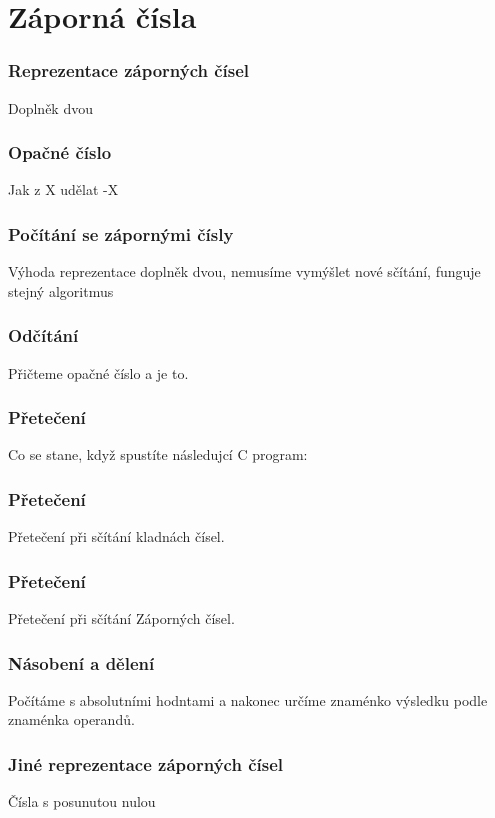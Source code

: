 \documentclass{beamer}
\begin{document}
\section{Záporná čísla}
\begin{frame}
\frametitle{Reprezentace záporných čísel}
Doplněk dvou

\end{frame}

\begin{frame}
\frametitle{Opačné číslo}

Jak z X udělat -X

\end{frame}


\begin{frame}
\frametitle{Počítání se zápornými čísly}

Výhoda reprezentace doplněk dvou, nemusíme vymýšlet nové sčítání, funguje stejný algoritmus
\end{frame}

\begin{frame}
\frametitle{Odčítání}

Přičteme opačné číslo a je to.
\end{frame}

\begin{frame}
\frametitle{Přetečení}

Co se stane, když spustíte následujcí C program:

\end{frame}

\begin{frame}
\frametitle{Přetečení}

Přetečení při sčítání kladnách čísel.
\end{frame}

\begin{frame}
\frametitle{Přetečení}

Přetečení při sčítání Záporných čísel.
\end{frame}

\begin{frame}
\frametitle{Násobení a dělení}

Počítáme s absolutními hodntami a nakonec určíme znaménko výsledku podle znaménka operandů.
\end{frame}

\begin{frame}
\frametitle{Jiné reprezentace záporných čísel}

Čísla s posunutou nulou
\end{frame}
\end{document}
